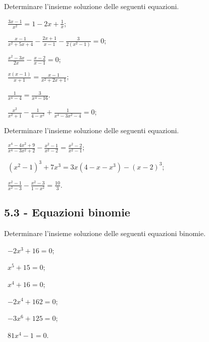 \begin{esercizio}[\Ast]
 \label{ese:5.10}
Determinare l'insieme soluzione delle seguenti equazioni.
\begin{multicols}{2}
 \begin{enumeratea}
 \item~$\frac{3x-1}{x^2}=1-2x+\frac 1 x$;
 \item~$\frac{x-1}{x^2+5x+4}-\frac{2x+1}{x-1}-\frac 3{2\left(x^2-1\right)}=0$;
 \item~$\frac{x^2-3x}{2x}-\frac{x-2}{x-1}=0$;
 \item~$\frac{x(x-1)}{x+1}=\frac{x-1}{x^2+2x+1}$;
 \item~$\frac 1{x^4-4}=\frac 3{x^4-16}$.
 \item~$\frac{x^2}{x^2+1}-\frac 1{4-x^2}+\frac 1{x^4-3x^2-4}=0$;
 \end{enumeratea}
 \end{multicols}
\end{esercizio}


\begin{esercizio}[\Ast]
 \label{ese:5.11}
Determinare l'insieme soluzione delle seguenti equazioni.
 \begin{enumeratea}
 \item~$\frac{x^4-4x^2+9}{x^4-3x^2+2}-\frac{x^2-1}{x^2-2}=\frac{x^2-2}{x^2-1}$;
 \item~$(x^2-1)^3+7x^3=3x(4-x-x^3)-(x-2)^3$;
 \item~$\frac{x^2-1}{x^2-3}-\frac{x^2-3}{1-x^2}=\frac{10} 3$.
 \end{enumeratea}
\end{esercizio}

\subsection*{5.3 - Equazioni binomie}

\begin{esercizio}
 \label{ese:5.12}
Determinare l'insieme soluzione delle seguenti equazioni binomie.
\begin{multicols}{3}
 \begin{enumeratea}
 \item~$-2x^3+16=0$;
 \item~$x^5+15=0$;
 \item~$x^4+16=0$;
 \item~$-2x^4+162=0$;
 \item~$-3x^6+125=0$;
 \item~$81x^4-1=0$.
 \end{enumeratea}
 \end{multicols}
\end{esercizio}

